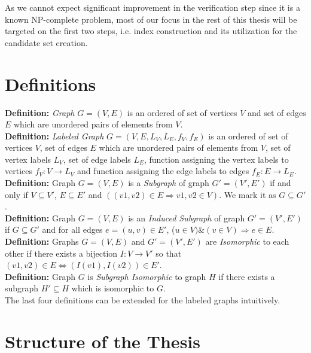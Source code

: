 As we cannot expect significant improvement in the verification step since it is a known NP-complete problem, most of our focus in the rest of this thesis will be targeted on the first two steps, i.e. index construction and its utilization for the candidate set creation.


\section*{Definitions}

\textbf{Definition:} \textit{Graph} $G=(V,E)$ is an ordered of set of vertices $V$ and set of edges $E$ which are unordered pairs of elements from $V$.\\

\noindent \textbf{Definition:} \textit{Labeled Graph} $G=(V,E,L_{V},L_{E},f_{V},f_{E})$ is an ordered of set of vertices $V$, set of edges $E$ which are unordered pairs of elements from $V$, set of vertex labels $L_{V}$,  set of edge labels $L_{E}$, function assigning the vertex labels to vertices $f_{V}: V \longrightarrow L_{V}$ and function assigning the edge labels to edges $f_{E}: E \longrightarrow L_{E}$.\\

\noindent \textbf{Definition:} Graph $G=(V,E)$ is a \textit{Subgraph} of graph $G'=(V',E')$ if and only if $V \subseteq V'$,  $E \subseteq E'$ and $((v1, v2) \in E \Longrightarrow v1, v2 \in V)$. We mark it as $G \subseteq G'$.\\

\noindent \textbf{Definition:} Graph $G=(V,E)$ is an \textit{Induced Subgraph} of graph $G'=(V',E')$ if $G \subseteq G'$ and for all edges $e=(u,v) \in E'$, ($u \in V) \& (v \in V) \Longrightarrow e \in E$.\\

\noindent \textbf{Definition:} Graphs $G=(V,E)$ and $G'=(V',E')$ are \textit{Isomorphic} to each other if there exists a bijection $I: V \longrightarrow V'$ so that $(v1,v2) \in E \Leftrightarrow (I(v1),I(v2)) \in E'$.\\

\noindent \textbf{Definition:} Graph $G$ is \textit{Subgraph Isomorphic} to graph $H$ if there exists a subgraph $H' \subseteq H$ which is isomorphic to $G$.\\

\noindent The last four definitions can be extended for the labeled graphs intuitively. 

\section*{Structure of the Thesis}

